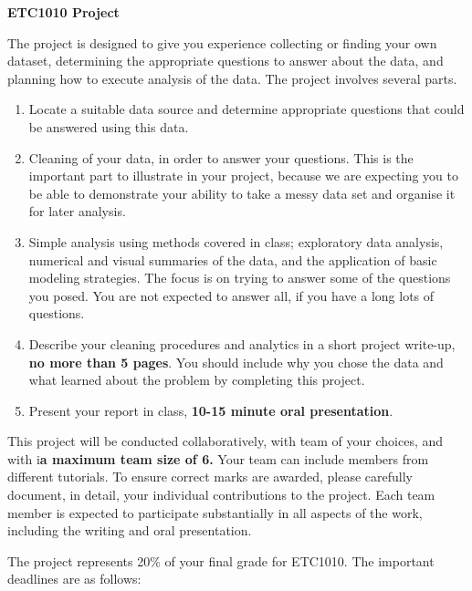 \documentclass{article}
\begin{document}
\centerline{\Large\bf ETC1010 Project}

\large 
\bigskip 
\bigskip The project is designed to give you
experience collecting or finding your own dataset, determining the
appropriate questions to answer about the data, and planning how to
execute analysis of the data.  The project involves several parts. 

\begin{enumerate} \itemsep 0in
\item Locate a suitable data source and determine appropriate questions that could be answered using this data. 
\item Cleaning of your data, in order to answer your questions. This is the important part to illustrate in your project, because we are expecting you to be able to demonstrate your ability to take a messy data set and organise it for later analysis.
\item Simple analysis using methods covered in class; exploratory data analysis, numerical and visual summaries of the data, and the application of basic modeling strategies. The focus is on trying to answer some of the questions you posed. You are not expected to answer all, if you have a long lots of questions. 
\item Describe your cleaning procedures and analytics in a short project write-up, {\bf no more than 5 pages}. You  should include why you chose the data and what learned about the problem by completing this project.
\item Present your report in class,  \textbf{10-15 minute oral presentation}.
\end{enumerate}

This project will be conducted collaboratively, with team of your choices, and with  i\textbf{a maximum team size of 6.} Your team can include members from different tutorials. To ensure correct marks are awarded, please carefully document, in detail, your individual contributions to the project. Each team member is expected to participate substantially in all aspects of the work, including the writing and oral presentation.

\bigskip
The project represents 20\% of your final grade for ETC1010. The important deadlines are as follows: 
\end{document}
